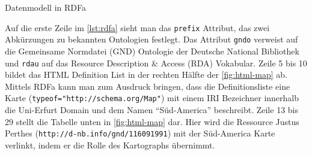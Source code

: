 \documentclass[float=false, crop=false]{standalone}
\begin{document}
\begin{listing}[ht]
\inputminted[numbersep=5pt,
frame=single,
framesep=1mm,
linenos]{html}{./code/rdfa.html}
\caption{Datenmodell in RDFa}
\label{lst:rdfa}
\end{listing}

Auf die erste Zeile im \autoref{lst:rdfa} sieht man das \texttt{prefix} Attribut, das zwei Abkürzungen zu bekannten Ontologien festlegt. Das Attribut \texttt{gndo} verweist auf die Gemeinsame Normdatei (GND) Ontologie der Deutsche National Bibliothek und \texttt{rdau} auf das Resource Description \& Access (RDA) Vokabular.  Zeile 5 bis 10 bildet das HTML Definition List in der rechten Hälfte der \autoref{fig:html-map} ab. Mittels RDFa kann man zum Ausdruck bringen, dass die Definitionsliste eine Karte (\texttt{typeof="http://schema.org/Map"}) mit einem IRI Bezeichner innerhalb die Uni-Erfurt Domain und dem Namen \hyphenquote{german}{Süd-America} beschreibt. Zeile 13 bis 29 stellt die Tabelle unten in \autoref{fig:html-map} dar. Hier wird die Ressource Justus Perthes (\texttt{http://d-nb.info/gnd/116091991}) mit der Süd-America Karte verlinkt, indem er die Rolle des Kartographs übernimmt. 
\end{document}
